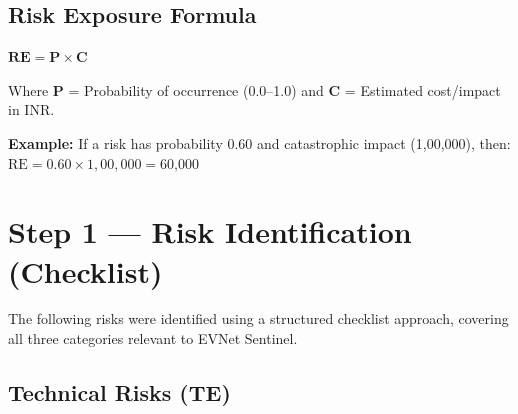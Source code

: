 \documentclass[11pt, a4paper]{article}
\begin{document}
\subsection{Risk Exposure Formula}

\begin{dangerbox}
\begin{center}
{\Large $\mathbf{RE = P \times C}$}
\end{center}
\vspace{0.3em}
Where \textbf{P} = Probability of occurrence (0.0--1.0) and \textbf{C} = Estimated cost/impact in INR.

\textbf{Example:} If a risk has probability 0.60 and catastrophic impact (1,00,000), then:\\
$\text{RE} = 0.60 \times 1{,}00{,}000 = \text{60,000}$
\end{dangerbox}

\newpage

\section{Step 1 --- Risk Identification (Checklist)}
\label{sec:identification}

The following risks were identified using a structured checklist approach, covering all three categories relevant to EVNet Sentinel.

\subsection{Technical Risks (TE)}
\end{document}
